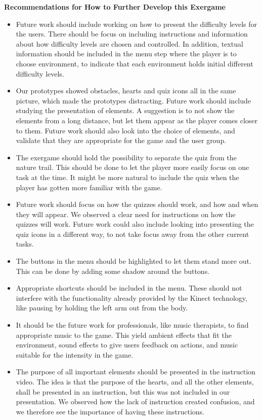 \textbf{Recommendations for How to Further Develop this Exergame}
\begin{itemize}
\renewcommand{\labelitemi}{$\bullet$}
\item Future work should include working on how to present the difficulty levels for the users. There should be focus on including instructions and information about how difficulty levels are chosen and controlled. In addition, textual information should be included in the menu step where the player is to choose environment, to indicate that each environment holds initial different difficulty levels.  
\item Our prototypes showed obstacles, hearts and quiz icons all in the same picture, which made the prototypes distracting. Future work should include studying the presentation of elements. A suggestion is to not show the elements from a long distance, but let them appear as the player comes closer to them. Future work should also look into the choice of elements, and validate that they are appropriate for the game and the user group. 
\item The exergame should hold the possibility to separate the quiz from the nature trail. This should be done to let the player more easily focus on one task at the time. It might be more natural to include the quiz when the player has gotten more familiar with the game.
\item Future work should focus on how the quizzes should work, and how and when they will appear. We observed a clear need for instructions on how the quizzes will work. Future work could also include looking into presenting the quiz icons in a different way, to not take focus away from the other current tasks. 
\item The buttons in the menu should be highlighted to let them stand more out. This can be done by adding some shadow around the buttons.
\item Appropriate shortcuts should be included in the menu. These should not interfere with the functionality already provided by the Kinect technology, like pausing by holding the left arm out from the body.
\item It should be the future work for professionals, like music therapists, to find appropriate music to the game. This yield ambient effects that fit the environment, sound effects to give users feedback on actions, and music suitable for the intensity in the game.  
\item The purpose of all important elements should be presented in the instruction video. The idea is that the purpose of the hearts, and all the other elements, shall be presented in an instruction, but this was not included in our presentation. We observed how the lack of instruction created confusion, and we therefore see the importance of having these instructions.  

\end{itemize}
